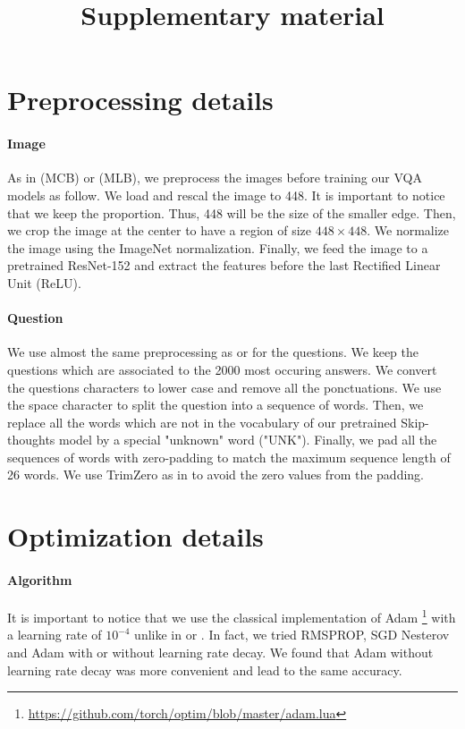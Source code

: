 \documentclass[10pt,twocolumn,letterpaper]{article}
\begin{document}
{\small


}

\title{Supplementary material}
\author{}

\maketitle

\section*{Preprocessing details}
\paragraph{Image}
As in \cite{fukui16mcb} (MCB) or \cite{Kim2017} (MLB), we preprocess the images before training our VQA models as follow. We load and rescal the image to 448. It is important to notice that we keep the proportion. Thus, 448 will be the size of the smaller edge. Then, we crop the image at the center to have a region of size $448 \times 448$. We normalize the image using the ImageNet normalization. Finally, we feed the image to a pretrained ResNet-152 and extract the features before the last Rectified Linear Unit (ReLU).

\paragraph{Question}

We use almost the same preprocessing as \cite{fukui16mcb} or \cite{Kim2017} for the questions.
We keep the questions which are associated to the 2000 most occuring answers.
We convert the questions characters to lower case and remove all the ponctuations. We use the space character to split the question into a sequence of words. Then, we replace all the words which are not in the vocabulary of our pretrained Skip-thoughts model by a special "unknown" word ("UNK").
Finally, we pad all the sequences of words with zero-padding to match the maximum sequence length of 26 words. We use TrimZero as in \cite{Kim2017} to avoid the zero values from the padding.


\section*{Optimization details}

\paragraph{Algorithm}
It is important to notice that we use the classical implementation of Adam \footnote{\url{https://github.com/torch/optim/blob/master/adam.lua}} with a learning rate of $10^{-4}$ unlike in \cite{fukui16mcb} or \cite{Kim2017}. In fact, we tried RMSPROP, SGD Nesterov and Adam with or without learning rate decay. We found that Adam without learning rate decay was more convenient and lead to the same accuracy.
\end{document}

